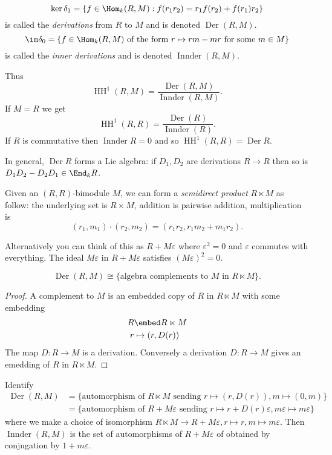 \documentclass[a4paper]{article}
\DeclareMathOperator{\HH}{HH}
\DeclareMathOperator{\Der}{Der}
\DeclareMathOperator{\Innder}{Innder}
\begin{document}
\begin{definition}
  \[
    \ker \delta_1 = \{f \in \Hom_k(R, M): f(r_1r_2) = r_1f(r_2) + f(r_1)r_2\}
  \]
  is called the \emph{derivations} from \(R\) to \(M\) and is denoted \(\Der(R, M)\).
  \[
    \im \delta_0 = \{f \in \Hom_k(R, M) \text{ of the form } r \mapsto rm - mr \text{ for some } m \in M\}
  \]
  is called the \emph{inner derivations} and is denoted \(\Innder(R, M)\).
\end{definition}

Thus
\[
  \HH^1(R, M) = \frac{\Der(R, M)}{\Innder(R, M)}.
\]
If \(M = R\) we get
\[
  \HH^1(R, R) = \frac{\Der(R)}{\Innder(R)}.
\]
If \(R\) is commutative then \(\Innder R = 0\) and so \(\HH^1(R, R) = \Der R\).

In general, \(\Der R\) forms a Lie algebra: if \(D_1, D_2\) are derivations \(R \to R\) then so is \(D_1D_2 - D_2D_1 \in \End_k R\).

\begin{definition}
  Given an \((R, R)\)-bimodule \(M\), we can form a \emph{semidirect product} \(R \ltimes M\) as follow: the underlying set is \(R \times M\), addition is pairwise addition, multiplication is
  \[
    (r_1, m_1) \cdot (r_2, m_2) = (r_1r_2, r_1m_2 + m_1r_2).
  \]
\end{definition}

Alternatively you can think of this as \(R + M\varepsilon\) where \(\varepsilon^2 = 0\) and \(\varepsilon\) commutes with everything. The ideal \(M\varepsilon\) in \(R + M\varepsilon\) satisfies \((M\varepsilon)^2 = 0\).

\begin{lemma}
  \[
    \Der(R, M) \cong \{\text{algebra complements to \(M\) in } R \ltimes M\}.
  \]
\end{lemma}

\begin{proof}
  A complement to \(M\) is an embedded copy of \(R\) in \(R \ltimes M\) with some embedding
  \begin{align*}
    R &\embed R \ltimes M \\
    r &\mapsto (r, D(r))
  \end{align*}
  The map \(D: R \to M\) is a derivation. Conversely a derivation \(D: R \to M\) gives an emedding of \(R\) in \(R \ltimes M\).
\end{proof}

\begin{corollary}
  Identify
  \begin{align*}
    \Der(R, M)
    &= \{\text{automorphism of \(R \ltimes M\) sending \(r \mapsto (r, D(r)), m \mapsto (0, m)\)}\} \\
    &= \{\text{automorphism of \(R + M\varepsilon\) sending \(r \mapsto r + D(r)\varepsilon, m\varepsilon \mapsto m \varepsilon\)}\}
  \end{align*}
  where we make a choice of isomorphism \(R \ltimes M \to R + M\varepsilon, r \mapsto r, m \mapsto m\varepsilon\). Then \(\Innder(R, M)\) is the set of automorphisms of \(R + M\varepsilon\) of obtained by conjugation by \(1 + m\varepsilon\).
\end{corollary}
\end{document}
